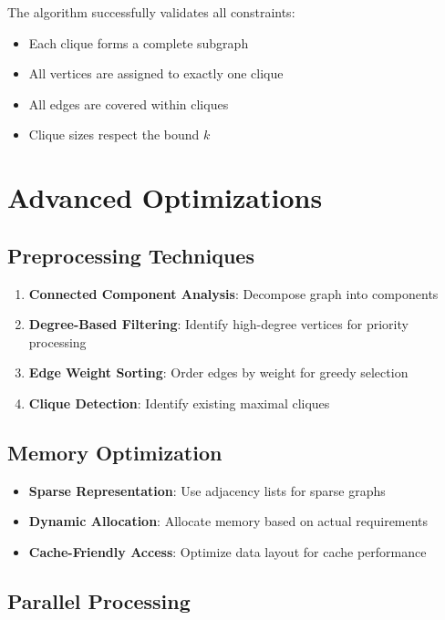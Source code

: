 \documentclass[12pt,a4paper]{article}
\begin{document}
The algorithm successfully validates all constraints:
\begin{itemize}
    \item Each clique forms a complete subgraph
    \item All vertices are assigned to exactly one clique
    \item All edges are covered within cliques
    \item Clique sizes respect the bound $k$
\end{itemize}

\section{Advanced Optimizations}

\subsection{Preprocessing Techniques}

\begin{enumerate}
    \item \textbf{Connected Component Analysis}: Decompose graph into components
    \item \textbf{Degree-Based Filtering}: Identify high-degree vertices for priority processing
    \item \textbf{Edge Weight Sorting}: Order edges by weight for greedy selection
    \item \textbf{Clique Detection}: Identify existing maximal cliques
\end{enumerate}

\subsection{Memory Optimization}

\begin{itemize}
    \item \textbf{Sparse Representation}: Use adjacency lists for sparse graphs
    \item \textbf{Dynamic Allocation}: Allocate memory based on actual requirements
    \item \textbf{Cache-Friendly Access}: Optimize data layout for cache performance
\end{itemize}

\subsection{Parallel Processing}
\end{document}
